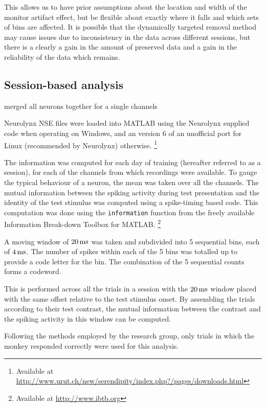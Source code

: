 This allows us to have prior assumptions about the location and width of the monitor artifact effect, but be flexible about exactly where it falls and which sets of bins are affected.
It is possible that the dynamically targeted removal method may cause issues due to inconsistency in the data across different sessions, but there is a clearly a gain in the amount of preserved data and a gain in the reliability of the data which remains.

\FloatBarrier
\subsection{Session-based analysis}

merged all neurons together for a single channels

Neurolynx NSE files were loaded into MATLAB using the Neurolynx supplied code when operating on Windows, and an version 6 of an unofficial port for Linux (recommended by Neurolynx) otherwise.%
\footnote{Available at
\\ \url{http://www.urut.ch/new/serendipity/index.php?/pages/downloads.html}}

The information was computed for each day of training (hereafter referred to as a session), for each of the channels from which recordings were available. To gauge the typical behaviour of a neuron, the mean was taken over all the channels.
The mutual information between the spiking activity during test presentation and the identity of the test stimulus was computed
using a spike-timing based code.
This computation was done using the \verb|information| function from the freely available Information Break-down Toolbox \cite{Magri2009} for MATLAB.%
\footnote{Available at \url{http://www.ibtb.org}}

A moving window of $\unit[20]{ms}$ was taken and subdivided into 5 sequential bins, each of $\unit[4]{ms}$.
The number of spikes within each of the 5 bins was totalled up to provide a code letter for the bin.
The combination of the 5 sequential counts forms a codeword.

This is performed across all the trials in a session with the $\unit[20]{ms}$ window placed with the same offset relative to the test stimulus onset.
By assembling the trials according to their test contrast, the mutual information between the contrast and the spiking activity in this window can be computed.

Following the methods employed by the research group, only trials in which the monkey responded correctly were used for this analysis.

